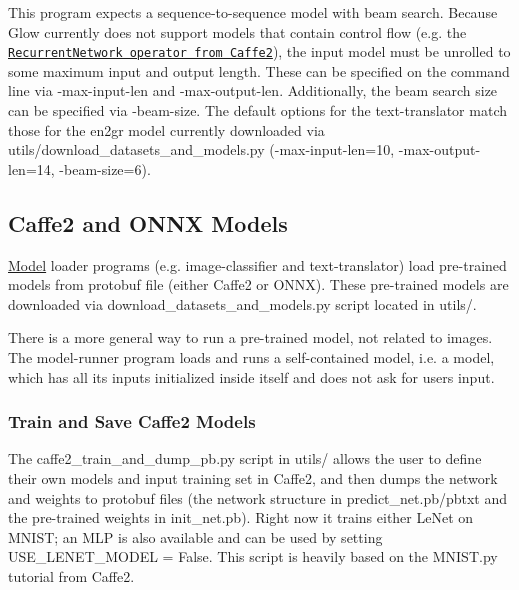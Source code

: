 

This program expects a sequence-\/to-\/sequence model with beam search. Because Glow currently does not support models that contain control flow (e.\+g. the \href{https://caffe2.ai/docs/operators-catalogue.html#recurrentnetwork}{\tt Recurrent\+Network operator from Caffe2}), the input model must be unrolled to some maximum input and output length. These can be specified on the command line via {\ttfamily -\/max-\/input-\/len} and {\ttfamily -\/max-\/output-\/len}. Additionally, the beam search size can be specified via {\ttfamily -\/beam-\/size}. The default options for the {\ttfamily text-\/translator} match those for the en2gr model currently downloaded via {\ttfamily utils/download\+\_\+datasets\+\_\+and\+\_\+models.\+py} ({\ttfamily -\/max-\/input-\/len=10}, {\ttfamily -\/max-\/output-\/len=14}, {\ttfamily -\/beam-\/size=6}).

\subsection*{Caffe2 and O\+N\+NX Models}

\hyperlink{struct_model}{Model} loader programs (e.\+g. {\ttfamily image-\/classifier} and {\ttfamily text-\/translator}) load pre-\/trained models from protobuf file (either Caffe2 or O\+N\+NX). These pre-\/trained models are downloaded via {\ttfamily download\+\_\+datasets\+\_\+and\+\_\+models.\+py} script located in {\ttfamily utils/}.

There is a more general way to run a pre-\/trained model, not related to images. The {\ttfamily model-\/runner} program loads and runs a self-\/contained model, i.\+e. a model, which has all its inputs initialized inside itself and does not ask for user\textquotesingle{}s input.

\subsubsection*{Train and Save Caffe2 Models}

The {\ttfamily caffe2\+\_\+train\+\_\+and\+\_\+dump\+\_\+pb.\+py} script in {\ttfamily utils/} allows the user to define their own models and input training set in Caffe2, and then dumps the network and weights to protobuf files (the network structure in {\ttfamily predict\+\_\+net.\+pb/pbtxt} and the pre-\/trained weights in {\ttfamily init\+\_\+net.\+pb}). Right now it trains either Le\+Net on M\+N\+I\+ST; an M\+LP is also available and can be used by setting {\ttfamily U\+S\+E\+\_\+\+L\+E\+N\+E\+T\+\_\+\+M\+O\+D\+EL = False}. This script is heavily based on the M\+N\+I\+S\+T.\+py tutorial from Caffe2.

